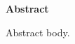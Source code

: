 \thispagestyle{plain}
\begin{center}
    \Large
    \textbf{\inserttitle}
    
    \vspace{0.6cm}
    \large
    \insertauthor
    
    \vspace{0.9cm}
    \textbf{Abstract}
\end{center}

Abstract body.
